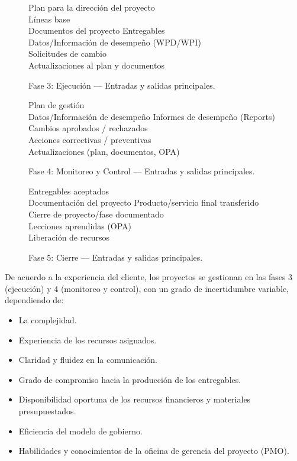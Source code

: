 \documentclass[12pt]
{charter}
\begin{document}
\begin{figure}[h]
\centering
{}
        {Plan para la direcci\'on del proyecto\\L\'ineas base\\Documentos del proyecto}
        {Entregables\\Datos/Informaci\'on de desempe\~no (WPD/WPI)\\Solicitudes de cambio\\Actualizaciones al plan y documentos}
\caption{Fase 3: Ejecuci\'on — Entradas y salidas principales.}
\label{fig:fase3}
\end{figure}

\begin{figure}[h]
\centering
{}
        {Plan de gesti\'on\\Datos/Informaci\'on de desempe\~no}
        {Informes de desempe\~no (Reports)\\Cambios aprobados / rechazados\\Acciones correctivas / preventivas\\Actualizaciones (plan, documentos, OPA)}
\caption{Fase 4: Monitoreo y Control — Entradas y salidas principales.}
\label{fig:fase4}
\end{figure}

\begin{figure}[h]
\centering
{}
        {Entregables aceptados\\Documentaci\'on del proyecto}
        {Producto/servicio final transferido\\Cierre de proyecto/fase documentado\\Lecciones aprendidas (OPA)\\Liberaci\'on de recursos}
\caption{Fase 5: Cierre — Entradas y salidas principales.}
\label{fig:fase5}
\end{figure}

\FloatBarrier

De acuerdo a la experiencia del cliente, los proyectos se gestionan en las fases 3 (ejecución) y 4 (monitoreo y control), con un grado de incertidumbre variable, dependiendo de:

\begin{itemize}
	\item La complejidad.
	\item Experiencia de los recursos asignados.
	\item Claridad y fluidez en la comunicación.
	\item Grado de compromiso hacia la producción de los entregables.
	\item Disponibilidad oportuna de los recursos financieros y materiales presupuestados.
	\item Eficiencia del modelo de gobierno.
	\item Habilidades y conocimientos de la oficina de gerencia del proyecto (PMO).
\end{itemize}
\end{document}
